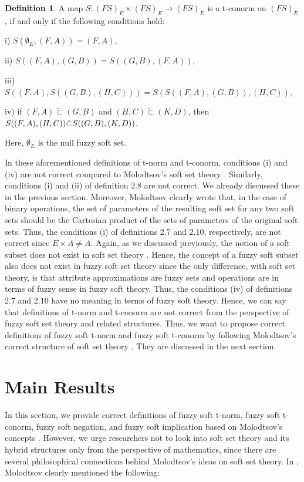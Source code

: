 \documentclass{article}
\theoremstyle{definition}
\newtheorem{definition}{Definition}[section]
\begin{document}
\begin{definition}\cite{6}  A map $S:(FS)_E \times (FS)_E \to (FS)_E$ is a t-conorm on $(FS)_E$, if and only if the following conditions hold:\vspace{1.5mm}
    
    i) $S(\emptyset_E, (F, A))= (F, A)$,

    ii) $S((F, A), (G, B))=S((G, B), (F, A))$,

    iii) $S((F, A), S((G, B), (H, C)))=S(S((F, A), (G, B)), (H, C))$,

    iv) if $(F, A)\tilde{\subset} (G, B)$ and  $(H, C)\tilde{\subset} (K, D)$, then $S((F, A), (H, C)) \tilde{\subset} S((G, B), (K, \\D))$.\vspace{1.5mm}

Here, $\emptyset_E$ is the null fuzzy soft set.
\end{definition}

In these aforementioned definitions of  t-norm and t-conorm, conditions (i) and (iv) are not correct compared to Molodtsov's soft set theory \cite{1,2,3,4,10, 12}. Similarly, conditions (i) and (ii) of definition 2.8 are not correct. We already discussed these in the previous section. Moreover, Molodtsov clearly wrote that, in the case of binary operations, the set of parameters of the resulting soft set for any two soft sets should be the Cartesian product of the sets of parameters of the original soft sets. Thus, the conditions (i) of definitions 2.7 and 2.10, respectively, are not correct since $E\times A\neq A$. Again, as we discussed previously, the notion of a soft subset does not exist in soft set theory \cite{2,3, 12}. Hence, the concept of a fuzzy soft subset also does not exist in fuzzy soft set theory since the only difference, with soft set theory, is that attribute approximations are fuzzy sets and operations are in terms of fuzzy sense in fuzzy soft theory. Thus, the conditions (iv) of definitions 2.7 and 2.10 have no meaning in terms of fuzzy soft theory. Hence, we can say that definitions of t-norm and t-conorm are not correct from the perspective of fuzzy soft set theory and related structures. Thus, we want to propose correct definitions of fuzzy soft t-norm and fuzzy soft t-conorm by following Molodtsov's correct structure of soft set theory \cite{1,2,3,4,10, 12}. They are discussed in the next section.

\section{Main Results}
In this section, we provide correct definitions of fuzzy soft t-norm, fuzzy soft t-conorm, fuzzy soft negation, and fuzzy soft implication based on Molodtsov's concepts \cite{1,2,3,4,10,12}.  However, we urge researchers not to look into soft set theory and its hybrid structures only from the perspective of mathematics, since there are several  philosophical connections behind Molodtsov's ideas on soft set theory. In \cite{2}, Molodtsov clearly mentioned the following:\\
\end{document}
